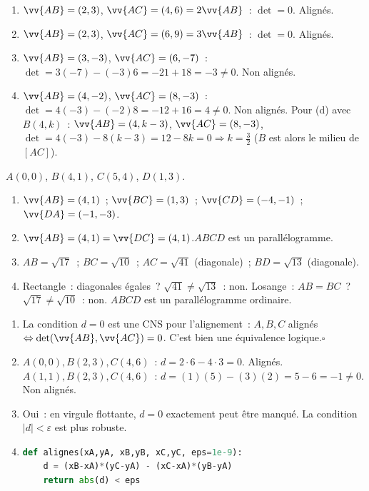 
\begin{enumerate}
  \item $\vv{AB}=(2,3)$, $\vv{AC}=(4,6)=2\vv{AB}$~: $\det=0$. Align\'es.
  \item $\vv{AB}=(2,3)$, $\vv{AC}=(6,9)=3\vv{AB}$~: $\det=0$. Align\'es.
  \item $\vv{AB}=(3,-3)$, $\vv{AC}=(6,-7)$~: $\det=3(-7)-(-3)6=-21+18=-3\ne0$. Non align\'es.
  \item $\vv{AB}=(4,-2)$, $\vv{AC}=(8,-3)$~: $\det=4(-3)-(-2)8=-12+16=4\ne0$. Non align\'es.
        Pour (d) avec $B(4,k)$~: $\vv{AB}=(4,k-3)$, $\vv{AC}=(8,-3)$, $\det=4(-3)-8(k-3)=12-8k=0\Rightarrow k=\tfrac32$
        ($B$ est alors le milieu de $[AC]$).
\end{enumerate}


$A(0,0)$, $B(4,1)$, $C(5,4)$, $D(1,3)$.
\begin{enumerate}
  \item $\vv{AB}=(4,1)$~; $\vv{BC}=(1,3)$~; $\vv{CD}=(-4,-1)$~; $\vv{DA}=(-1,-3)$.
  \item $\vv{AB}=(4,1)=\vv{DC}=(4,1)$.\checkmark\quad $ABCD$ est un parall\'elogramme.
  \item $AB=\sqrt{17}$~; $BC=\sqrt{10}$~;
        $AC=\sqrt{41}$ (diagonale)~; $BD=\sqrt{13}$ (diagonale).
  \item Rectangle~: diagonales \'egales~? $\sqrt{41}\ne\sqrt{13}$~: non.
        Losange~: $AB=BC$~? $\sqrt{17}\ne\sqrt{10}$~: non.
        $ABCD$ est un parall\'elogramme ordinaire.
\end{enumerate}


\begin{enumerate}
  \item La condition $d=0$ est une CNS pour l'alignement~:
        $A,B,C$ align\'es $\Leftrightarrow\det(\vv{AB},\vv{AC})=0$.
        C'est bien une \'equivalence logique.\hfill$\square$
  \item $A(0,0),B(2,3),C(4,6)$~: $d=2\cdot6-4\cdot3=0$. Align\'es.\checkmark\quad
        $A(1,1),B(2,3),C(4,6)$~: $d=(1)(5)-(3)(2)=5-6=-1\ne0$. Non align\'es.\checkmark
  \item Oui~: en virgule flottante, $d=0$ exactement peut \^etre manqu\'e.
        La condition $|d|<\varepsilon$ est plus robuste.
  \item
\begin{lstlisting}[language=Python]
def alignes(xA,yA, xB,yB, xC,yC, eps=1e-9):
    d = (xB-xA)*(yC-yA) - (xC-xA)*(yB-yA)
    return abs(d) < eps
\end{lstlisting}
\end{enumerate}

